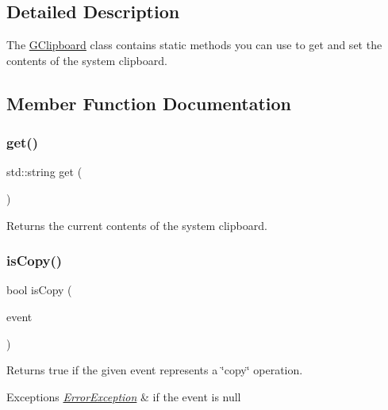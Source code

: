 \subsection{Detailed Description}
The \mbox{\hyperlink{classGClipboard}{G\+Clipboard}} class contains static methods you can use to get and set the contents of the system clipboard. 

\subsection{Member Function Documentation}
\mbox{\label{classGClipboard_a4879b26a87a0b49f7d535c7a669620f6}} 
\subsubsection{\texorpdfstring{get()}{get()}}
{\footnotesize\ttfamily std\+::string get (\begin{DoxyParamCaption}{ }\end{DoxyParamCaption})\hspace{0.3cm}{\ttfamily [static]}}



Returns the current contents of the system clipboard. 

\mbox{\label{classGClipboard_a813cbc957e264a1846175ece316757d3}} 
\subsubsection{\texorpdfstring{is\+Copy()}{isCopy()}}
{\footnotesize\ttfamily bool is\+Copy (\begin{DoxyParamCaption}\item[{Q\+Key\+Event $\ast$}]{event }\end{DoxyParamCaption})\hspace{0.3cm}{\ttfamily [static]}}



Returns true if the given event represents a \char`\"{}copy\char`\"{} operation. 


\begin{DoxyExceptions}{Exceptions}
{\em \mbox{\hyperlink{classErrorException}{Error\+Exception}}} & if the event is null \\
\hline
\end{DoxyExceptions}
\mbox{\label{classGClipboard_a5ea46b856cb8eae1295b1e2b7db664aa}} 
